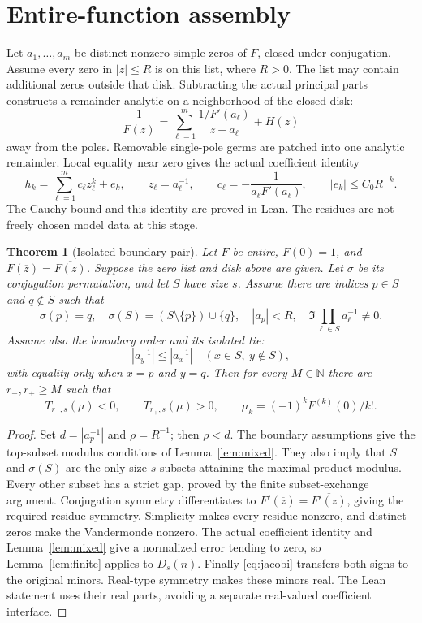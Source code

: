 \documentclass[11pt]{amsart}
\newtheorem{theorem}{Theorem}[section]
\newcommand{\N}{\mathbb N}
\begin{document}
\section{Entire-function assembly}
Let $a_1,\ldots,a_m$ be distinct nonzero simple zeros of $F$, closed under conjugation. Assume every zero in $|z|\le R$ is on this list, where $R>0$. The list may contain additional zeros outside that disk. Subtracting the actual principal parts constructs a remainder analytic on a neighborhood of the closed disk:
\[
 \frac1{F(z)}
   =\sum_{\ell=1}^m\frac{1/F'(a_\ell)}{z-a_\ell}+H(z)
\]
away from the poles. Removable single-pole germs are patched into one analytic remainder. Local equality near zero gives the actual coefficient identity
\[
 h_k=\sum_{\ell=1}^m c_\ell z_\ell^k+e_k,\qquad
 z_\ell=a_\ell^{-1},\qquad
 c_\ell=-\frac1{a_\ell F'(a_\ell)},\qquad
 |e_k|\le C_0R^{-k}.
\]
The Cauchy bound and this identity are proved in Lean. The residues are not freely chosen model data at this stage.

\begin{theorem}[Isolated boundary pair]\label{thm:entire}
Let $F$ be entire, $F(0)=1$, and
$F(\overline z)=\overline{F(z)}$. Suppose the zero list and disk above are given.
Let $\sigma$ be its conjugation permutation, and let $S$ have size $s$.
Assume there are indices $p\in S$ and $q\notin S$ such that
\[
 \sigma(p)=q,\quad
 \sigma(S)=(S\setminus\{p\})\cup\{q\},\quad
 |a_p|<R,\quad
 \Im\prod_{\ell\in S}a_\ell^{-1}\ne0.
\]
Assume also the boundary order and its isolated tie:
\[
 |a_y^{-1}|\le |a_x^{-1}|
       \quad(x\in S,\ y\notin S),
\]
with equality only when $x=p$ and $y=q$.
Then for every $M\in\N$ there are $r_-,r_+\ge M$ such that
\[
 T_{r_-,s}(\mu)<0,\qquad T_{r_+,s}(\mu)>0,
 \qquad \mu_k=(-1)^kF^{(k)}(0)/k!.
\]
\end{theorem}

\begin{proof}
Set $d=|a_p^{-1}|$ and $\rho=R^{-1}$; then $\rho<d$.
The boundary assumptions give the top-subset modulus conditions of Lemma~\ref{lem:mixed}. They also imply that $S$ and $\sigma(S)$ are the only size-$s$ subsets attaining the maximal product modulus. Every other subset has a strict gap, proved by the finite subset-exchange argument. Conjugation symmetry differentiates to
$F'(\overline z)=\overline{F'(z)}$, giving the required residue symmetry. Simplicity makes every residue nonzero, and distinct zeros make the Vandermonde nonzero.
The actual coefficient identity and Lemma~\ref{lem:mixed} give a normalized error tending to zero, so Lemma~\ref{lem:finite} applies to $D_s(n)$. Finally \eqref{eq:jacobi} transfers both signs to the original minors. Real-type symmetry makes these minors real. The Lean statement uses their real parts, avoiding a separate real-valued coefficient interface.
\end{proof}
\end{document}
